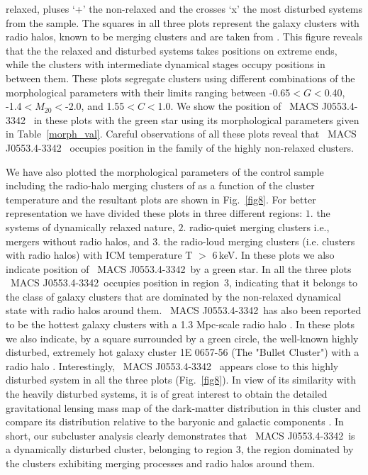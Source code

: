 \documentclass[useASM,usenatbib]{mn2e}
\newcommand{\mac}{\rm~MACS J0553.4-3342}
\begin{document}
relaxed, pluses `+' the non-relaxed and the crosses `x' the most
disturbed systems from the sample. The squares in all three plots
represent the galaxy clusters with radio halos, known to be merging
clusters and are taken from \cite{2009A&A...507.1257G}. This figure
reveals that the the relaxed and disturbed systems takes positions on
extreme ends, while the clusters with intermediate dynamical stages
occupy positions in between them. These plots segregate clusters using
different combinations of the morphological parameters with their
limits ranging between -0.65$<$$G$$<$0.40, -1.4$<$$M_{20}$$<$-2.0, and
1.55$<$$C$$<$1.0. We show the position of \mac~ in these plots with
the green star using its morphological parameters given in
Table~\ref{morph_val}. Careful observations of all these plots reveal
that \mac~ occupies position in the family of the highly non-relaxed
clusters.

We have also plotted the morphological parameters of the control
sample including the radio-halo merging clusters of
\cite{2009A&A...507.1257G} as a function of the cluster temperature
and the resultant plots are shown in Fig.~\ref{fig8}. For better
representation we have divided these plots in three different regions:
$1.$ the systems of dynamically relaxed nature, $2.$ radio-quiet
merging clusters i.e., mergers without radio halos, and $3.$ the
radio-loud merging clusters (i.e. clusters with radio halos) with ICM
temperature T $>$ 6\,keV. In these plots we also indicate position of
\mac\ by a green star. In all the three plots \mac\ occupies
position in region~3, indicating that it belongs to the class of galaxy
clusters that are dominated by the non-relaxed dynamical state with
radio halos around them. \mac\ has also been reported to be the
hottest galaxy clusters with a 1.3 Mpc-scale radio halo
\citep{2012MNRAS.426...40B}. In these plots we also indicate,
 by a square surrounded by a green circle, 
the well-known highly disturbed, extremely hot galaxy cluster 1E 0657-56 (The "Bullet Cluster") with a radio halo
\citep{2002ApJ...567L..27M,2014MNRAS.440.2901S}. Interestingly, \mac~
appears close to this highly disturbed system in all the
three plots (Fig.~\ref{fig8}).  In view of its similarity with the
heavily disturbed systems, it is of great interest to obtain the
detailed gravitational lensing mass map of the dark-matter
distribution in this cluster and compare its distribution relative to
the baryonic and galactic components \citep{2017arXiv170603535E}. In short, our subcluster
analysis clearly demonstrates that \mac\ is a dynamically  disturbed
cluster, belonging to region 3, the region dominated by the clusters
exhibiting merging processes and radio halos around them.  \par
\end{document}
